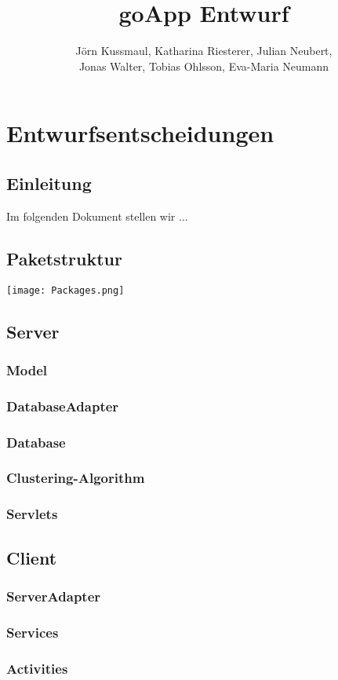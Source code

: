 \documentclass{scrartcl}
\title{goApp Entwurf}
\author{Jörn Kussmaul, Katharina Riesterer, Julian Neubert,\\ Jonas Walter, Tobias Ohlsson, Eva-Maria Neumann}
\begin{document}
	\maketitle
	\newpage
	\tableofcontents
	\newpage

	\section{Entwurfsentscheidungen}
	\subsection{Einleitung}
	Im folgenden Dokument stellen wir ...
	\subsection{Paketstruktur}
	 \texttt{[image: Packages.png]}
	\subsection{Server}
	\subsubsection{Model}
	\subsubsection{DatabaseAdapter}
	\subsubsection{Database}
	\subsubsection{Clustering-Algorithm}
	\subsubsection{Servlets}
	\subsection{Client}
	\subsubsection{ServerAdapter}
	\subsubsection{Services}
	\subsubsection{Activities}
\end{document}

